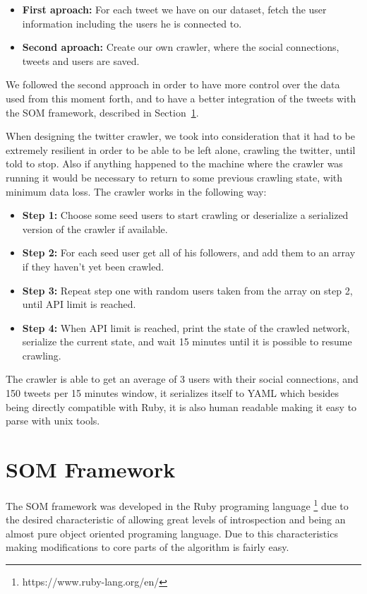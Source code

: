 \begin{itemize}
  \item \textbf{First aproach: } For each tweet we have on our dataset, fetch the user information including the users he is connected to.
  \item \textbf{Second aproach: } Create our own crawler, where the social connections, tweets and users are saved.
\end{itemize}                                                                                             
We followed the second approach in order to have more control over the data used from this moment forth, and to have a better integration of the tweets with the \ac{SOM} framework, described in Section~\ref{sec:som_framework}.

When designing the twitter crawler, we took into consideration that it had to be extremely resilient in order to be able to be left alone, crawling the twitter, until told to stop. Also if anything happened to the machine where the crawler was running it would be necessary to return to some previous crawling state, with minimum data loss. The crawler works in the following way:

\begin{itemize}
  \item \textbf{Step 1:} Choose some seed users to start crawling or deserialize a serialized version of the crawler if available.
  \item \textbf{Step 2:} For each seed user get all of his followers, and add them to an array if they haven't yet been crawled.
  \item \textbf{Step 3:} Repeat step one with random users taken from the array on step 2, until API limit is reached.
  \item \textbf{Step 4:} When API limit is reached, print the state of the crawled network, serialize the current state, and wait 15 minutes until it is possible to resume crawling. 
\end{itemize}

The crawler is able to get an average of 3 users with their social connections, and 150 tweets per 15 minutes window, it serializes itself to \ac{YAML} which besides being directly compatible with Ruby, it is also human readable making it easy to parse with unix tools.


\section{SOM Framework}
\label{sec:som_framework}
The \ac{SOM} framework was developed in the Ruby programing language \footnote{https://www.ruby-lang.org/en/} due to the desired characteristic of allowing great levels of introspection and being an almost pure object oriented programing language. Due to this characteristics making modifications to core parts of the algorithm is fairly easy.

